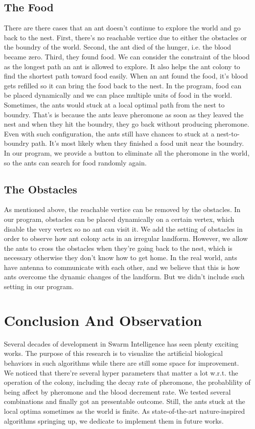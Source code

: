 \documentclass[12pt,journal,compsoc]{IEEEtran}
\begin{document}
\subsection{The Food}
There are there cases that an ant doesn't continue to explore the world and go back to the nest. First, there's no reachable vertice due to either the obstacles or the boundry of the world. Second, the ant died of the hunger, i.e. the blood became zero. Third, they found food. We can consider the constraint of the blood as the longest path an ant is allowed to explore. It also helps the ant colony to find the shortest path toward food easily. When an ant found the food, it's blood gets refilled so it can bring the food back to the nest. In the program, food can be placed dynamically and we can place multiple units of food in the world. Sometimes, the ants would stuck at a local optimal path from the nest to boundry. That's is because the ants leave pheromone as soon as they leaved the nest and when they hit the boundry, they go back without producing pheromone. Even with such configuration, the ants still have chances to stuck at a nest-to-boundry path. It's most likely when they finished a food unit near the boundry. In our program, we provide a button to eliminate all the pheromone in the world, so the ants can search for food randomly again.

\subsection{The Obstacles}
As mentioned above, the reachable vertice can be removed by the obstacles. In our program, obstacles can be placed dynamically on a certain vertex, which disable the very vertex so no ant can visit it. We add the setting of obstacles in order to observe how ant colony acts in an irregular landform. However, we allow the ants to cross the obstacles when they're going back to the nest, which is necessary otherwise they don't know how to get home. In the real world, ants have antenna to communicate with each other, and we believe that this is how ants overcome the dynamic changes of the landform. But we didn't include such setting in our program.


\section{Conclusion And Observation}
Several decades of development in Swarm Intelligence has seen plenty exciting works. The purpose of this research is to visualize the artificial biological behaviors in such algorithms while there are still some space for improvement. We noticed that there're several hyper parameters that matter a lot w.r.t. the operation of the colony, including the decay rate of pheromone, the probablility of being affect by pheromone and the blood decrement rate. We tested several combinations and finally got an presentable outcome. Still, the ants stuck at the local optima sometimes as the world is finite. As state-of-the-art nature-inspired algorithms springing up, we dedicate to implement them in future works.
\end{document}
